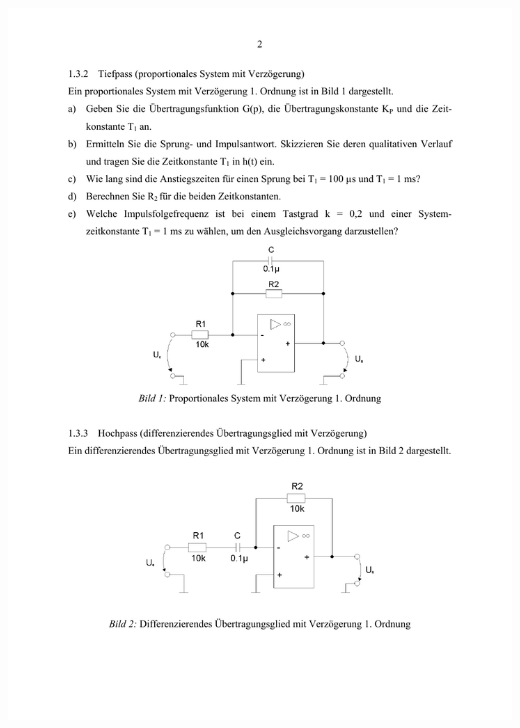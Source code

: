 \includegraphics[width=1.0\textwidth]{Bilder/Grundubertragungsglieder im Zeitbereich (verschoben) 2}\newpage

